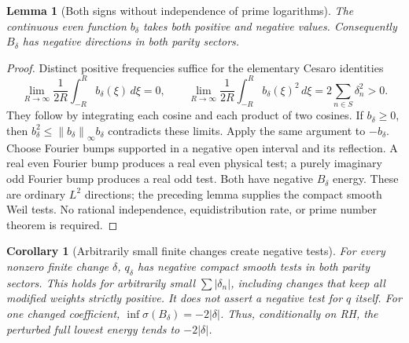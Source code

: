 \documentclass[11pt]{article}
\newtheorem{lemma}[theorem]{Lemma}
\newtheorem{corollary}[theorem]{Corollary}
\theoremstyle{remark}
\newcommand{\norm}[1]{\left\lVert #1\right\rVert}
\begin{document}
\begin{lemma}[Both signs without independence of prime logarithms]\label{lem:ns57-symbol-signs}
The continuous even function $b_\delta$ takes both positive and negative
values. Consequently $B_\delta$ has negative directions in both parity sectors.
\end{lemma}
\begin{proof}
Distinct positive frequencies suffice for the elementary Cesaro identities
\[
 \lim_{R\to\infty}\frac1{2R}\int_{-R}^R b_\delta(\xi)\,d\xi=0,
 \qquad
 \lim_{R\to\infty}\frac1{2R}\int_{-R}^R b_\delta(\xi)^2\,d\xi
       =2\sum_{n\in S}\delta_n^2>0.
\]
They follow by integrating each cosine and each product of two cosines.
If $b_\delta\ge0$, then $b_\delta^2\le\norm{b_\delta}_\infty b_\delta$
contradicts these limits. Apply the same argument to $-b_\delta$.
Choose Fourier bumps supported in a negative open interval and its
reflection. A real even Fourier bump produces a real even physical
test; a purely imaginary odd Fourier bump produces a real odd test.
Both have negative $B_\delta$ energy. These are ordinary $L^2$
directions; the preceding lemma supplies the compact smooth Weil tests.
No rational independence, equidistribution rate, or prime number theorem
is required.
\end{proof}

\begin{corollary}[Arbitrarily small finite changes create negative tests]\label{cor:ns57-finite-weight-negative}
For every nonzero finite change $\delta$, $q_\delta$ has negative compact
smooth tests in both parity sectors. This holds for arbitrarily small
$\sum|\delta_n|$, including changes that keep all modified weights
strictly positive. It does not assert a negative test for $q$ itself.
For one changed coefficient, $\inf\sigma(B_\delta)=-2|\delta|$.
Thus, conditionally on RH, the perturbed full lowest energy tends
to $-2|\delta|$.
\end{corollary}
\end{document}
